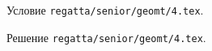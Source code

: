 Условие \texttt{regatta/senior/geomt/4.tex}.

\solution Решение \texttt{regatta/senior/geomt/4.tex}.
